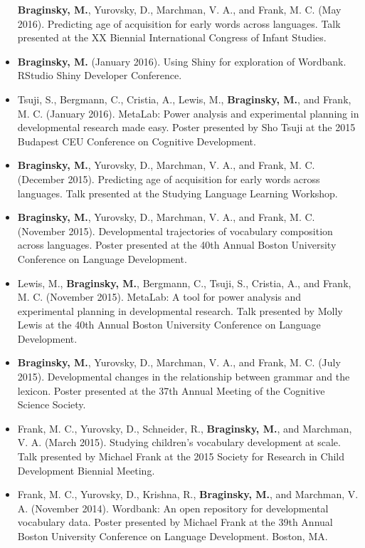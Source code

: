 \documentclass[11pt,]{article}
\begin{document}
\begin{itemize}
  \textbf{Braginsky, M.}, Yurovsky, D., Marchman, V. A., and Frank, M.
  C. (May 2016). Predicting age of acquisition for early words across
  languages. Talk presented at the XX Biennial International Congress of
  Infant Studies.
\item
  \textbf{Braginsky, M.} (January 2016). Using Shiny for exploration of
  Wordbank. RStudio Shiny Developer Conference.
\item
  Tsuji, S., Bergmann, C., Cristia, A., Lewis, M., \textbf{Braginsky,
  M.}, and Frank, M. C. (January 2016). MetaLab: Power analysis and
  experimental planning in developmental research made easy. Poster
  presented by Sho Tsuji at the 2015 Budapest CEU Conference on
  Cognitive Development.
\item
  \textbf{Braginsky, M.}, Yurovsky, D., Marchman, V. A., and Frank, M.
  C. (December 2015). Predicting age of acquisition for early words
  across languages. Talk presented at the Studying Language Learning
  Workshop.
\item
  \textbf{Braginsky, M.}, Yurovsky, D., Marchman, V. A., and Frank, M.
  C. (November 2015). Developmental trajectories of vocabulary
  composition across languages. Poster presented at the 40th Annual
  Boston University Conference on Language Development.
\item
  Lewis, M., \textbf{Braginsky, M.}, Bergmann, C., Tsuji, S., Cristia,
  A., and Frank, M. C. (November 2015). MetaLab: A tool for power
  analysis and experimental planning in developmental research. Talk
  presented by Molly Lewis at the 40th Annual Boston University
  Conference on Language Development.
\item
  \textbf{Braginsky, M.}, Yurovsky, D., Marchman, V. A., and Frank, M.
  C. (July 2015). Developmental changes in the relationship between
  grammar and the lexicon. Poster presented at the 37th Annual Meeting
  of the Cognitive Science Society.
\item
  Frank, M. C., Yurovsky, D., Schneider, R., \textbf{Braginsky, M.}, and
  Marchman, V. A. (March 2015). Studying children's vocabulary
  development at scale. Talk presented by Michael Frank at the 2015
  Society for Research in Child Development Biennial Meeting.
\item
  Frank, M. C., Yurovsky, D., Krishna, R., \textbf{Braginsky, M.}, and
  Marchman, V. A. (November 2014). Wordbank: An open repository for
  developmental vocabulary data. Poster presented by Michael Frank at
  the 39th Annual Boston University Conference on Language Development.
  Boston, MA.
\end{itemize}
\end{document}

